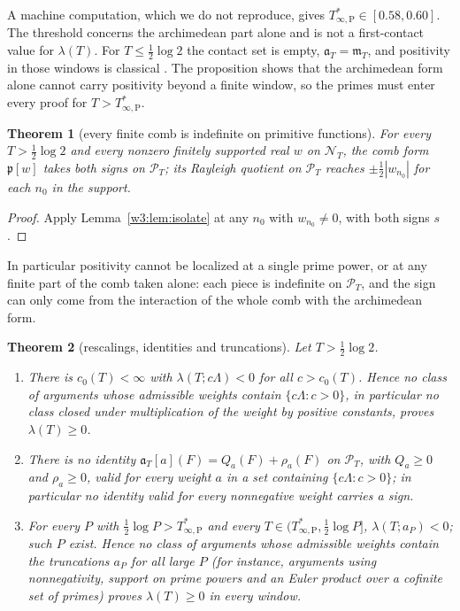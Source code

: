 \documentclass[11pt]{amsart}
\newtheorem{theorem}{Theorem}[section]
\theoremstyle{definition}
\theoremstyle{remark}
\numberwithin{equation}{section}
\newcommand{\PT}{\mathcal{P}_T}                        %
\newcommand{\NT}{\mathcal{N}_T}                        %
\newcommand{\mT}{\mathfrak{m}_T}                       %
\newcommand{\aT}{\mathfrak{a}_T}                       %
\newcommand{\lam}{\lambda(T)}                          %
\newcommand{\Tarch}{T^{*}_{\infty,\mathrm P}}          %
\begin{document}
A machine computation, which we do not reproduce, gives $\Tarch\in[0.58,0.60]$. The threshold concerns the
archimedean part alone and is not a first-contact value for $\lam$. For $T\le\frac12\log2$ the contact set is empty,
$\aT=\mT$, and positivity in those windows is classical \cite{Yoshida1992}. The proposition shows that the
archimedean form alone cannot carry positivity beyond a finite window, so the primes must enter every proof for
$T>\Tarch$.

\begin{theorem}[every finite comb is indefinite on primitive functions]\label{w3:bar:B6}
For every $T>\frac12\log2$ and every nonzero finitely supported real $w$ on $\NT$, the comb form
$\mathfrak p[w]$ takes both signs on $\PT$; its Rayleigh quotient on $\PT$ reaches $\pm\frac12|w_{n_0}|$ for each
$n_0$ in the support.
\end{theorem}

\begin{proof}
Apply Lemma~\ref{w3:lem:isolate} at any $n_0$ with $w_{n_0}\ne0$, with both signs $s$.
\end{proof}

In particular positivity cannot be localized at a single prime power, or at any finite part of the comb taken
alone: each piece is indefinite on $\PT$, and the sign can only come from the interaction of the whole comb with
the archimedean form.

\begin{theorem}[rescalings, identities and truncations]\label{w3:bar:B1}
Let $T>\frac12\log2$.
\begin{enumerate}[label=(\roman*)]
\item\label{w3:B1i} There is $c_0(T)<\infty$ with $\lambda(T;c\Lambda)<0$ for all $c>c_0(T)$.
Hence no class of arguments whose admissible weights contain $\{c\Lambda:c>0\}$, in particular no class closed
under multiplication of the weight by positive constants, proves $\lam\ge0$.
\item\label{w3:B1ii} There is no identity
$\aT[a](F)=Q_a(F)+\rho_a(F)$ on $\PT$, with $Q_a\ge0$ and $\rho_a\ge0$, valid for every weight $a$ in a set
containing $\{c\Lambda:c>0\}$; in particular no identity valid for every nonnegative weight carries a sign.
\item\label{w3:B1iii} For every $P$ with $\frac12\log P>\Tarch$ and every
$T\in(\Tarch,\frac12\log P]$, $\lambda(T;a_P)<0$; such $P$ exist. Hence no class of arguments whose admissible
weights contain the truncations $a_P$ for all large $P$ (for instance, arguments using nonnegativity, support
on prime powers and an Euler product over a cofinite set of primes) proves $\lam\ge0$ in every window.
\end{enumerate}
\end{theorem}
\end{document}
